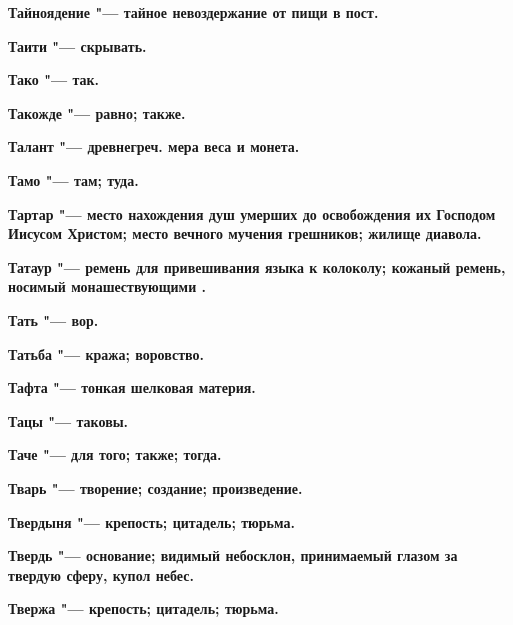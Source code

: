 \begin{multicols}{2}
\bfseries Тайноядение\normalfont{} "--- тайное невоздержание от пищи в пост. 




\bfseries Таити\normalfont{} "--- скрывать. 




\bfseries Тако\normalfont{} "--- так. 




\bfseries Такожде\normalfont{} "--- равно; также. 




\bfseries Талант\normalfont{} "--- древнегреч. мера веса и монета. 




\bfseries Тамо\normalfont{} "--- там; туда. 




\bfseries Тартар\normalfont{} "--- место нахождения душ умерших до освобождения их Господом Иисусом Христом; место вечного мучения грешников; жилище диавола. 




\bfseries Татаур\normalfont{} "--- ремень для привешивания языка к колоколу; кожаный ремень, носимый монашествующими . 




\bfseries Тать\normalfont{} "--- вор. 




\bfseries Татьба\normalfont{} "--- кража; воровство. 




\bfseries Тафта\normalfont{} "--- тонкая шелковая материя. 




\bfseries Тацы\normalfont{} "--- таковы. 




\bfseries Таче\normalfont{} "--- для того; также; тогда. 




\bfseries Тварь\normalfont{} "--- творение; создание; произведение. 




\bfseries Твердыня\normalfont{} "--- крепость; цитадель; тюрьма. 




\bfseries Твердь\normalfont{} "--- основание; видимый небосклон, принимаемый глазом за твердую сферу, купол небес. 




\bfseries Твержа\normalfont{} "--- крепость; цитадель; тюрьма. 





\end{multicols}
